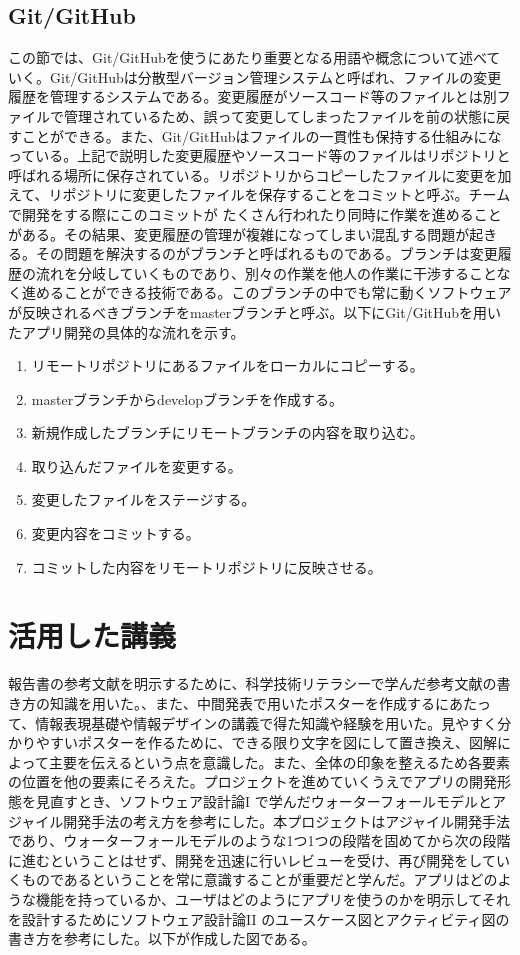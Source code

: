 \documentclass[openany,11pt,papersize]{jsbook}
\begin{document}
\begin{appendix}
\section{Git/GitHub}
この節では、Git/GitHubを使うにあたり重要となる用語や概念について述べていく。Git/GitHubは分散型バージョン管理システムと呼ばれ、ファイルの変更履歴を管理するシステムである。変更履歴がソースコード等のファイルとは別ファイルで管理されているため、誤って変更してしまったファイルを前の状態に戻すことができる。また、Git/GitHubはファイルの一貫性も保持する仕組みになっている。上記で説明した変更履歴やソースコード等のファイルはリポジトリと呼ばれる場所に保存されている。リポジトリからコピーしたファイルに変更を加えて、リポジトリに変更したファイルを保存することをコミットと呼ぶ。チームで開発をする際にこのコミットが
たくさん行われたり同時に作業を進めることがある。その結果、変更履歴の管理が複雑になってしまい混乱する問題が起きる。その問題を解決するのがブランチと呼ばれるものである。ブランチは変更履歴の流れを分岐していくものであり、別々の作業を他人の作業に干渉することなく進めることができる技術である。このブランチの中でも常に動くソフトウェアが反映されるべきブランチをmasterブランチと呼ぶ。以下にGit/GitHubを用いたアプリ開発の具体的な流れを示す。
\begin{enumerate}
 \item リモートリポジトリにあるファイルをローカルにコピーする。
 \item masterブランチからdevelopブランチを作成する。
 \item 新規作成したブランチにリモートブランチの内容を取り込む。
 \item 取り込んだファイルを変更する。
 \item 変更したファイルをステージする。
 \item 変更内容をコミットする。
 \item コミットした内容をリモートリポジトリに反映させる。
\end{enumerate}


\chapter{活用した講義}
 報告書の参考文献を明示するために、科学技術リテラシーで学んだ参考文献の書き方の知識を用いた。、また、中間発表で用いたポスターを作成するにあたって、情報表現基礎や情報デザインの講義で得た知識や経験を用いた。見やすく分かりやすいポスターを作るために、できる限り文字を図にして置き換え、図解によって主要を伝えるという点を意識した。また、全体の印象を整えるため各要素の位置を他の要素にそろえた。プロジェクトを進めていくうえでアプリの開発形態を見直すとき、ソフトウェア設計論I  で学んだウォーターフォールモデルとアジャイル開発手法の考え方を参考にした。本プロジェクトはアジャイル開発手法であり、ウォーターフォールモデルのような1つ1つの段階を固めてから次の段階に進むということはせず、開発を迅速に行いレビューを受け、再び開発をしていくものであるということを常に意識することが重要だと学んだ。アプリはどのような機能を持っているか、ユーザはどのようにアプリを使うのかを明示してそれを設計するためにソフトウェア設計論II  のユースケース図とアクティビティ図の書き方を参考にした。以下が作成した図である。


\end{appendix}
\end{document}
